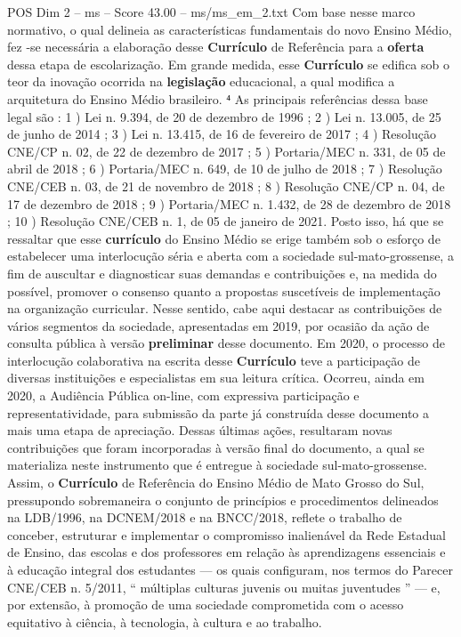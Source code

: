 \begin{textsample}{POS Dim 2 – ms – Score 43.00 – ms/ms\_em\_2.txt}
Com base nesse marco normativo, o qual delineia as características fundamentais do novo Ensino Médio, fez -se necessária a elaboração desse \textbf{Currículo} de Referência para a \textbf{oferta} dessa etapa de escolarização.
Em grande medida, esse \textbf{Currículo} se edifica sob o teor da inovação ocorrida na \textbf{legislação} educacional, a qual modifica a arquitetura do Ensino Médio brasileiro. ⁴ As principais referências dessa base legal são : 1 ) Lei n. 9.394, de 20 de dezembro de 1996 ; 2 ) Lei n. 13.005, de 25 de junho de 2014 ; 3 ) Lei n. 13.415, de 16 de fevereiro de 2017 ; 4 ) Resolução CNE/CP n. 02, de 22 de dezembro de 2017 ; 5 ) Portaria/MEC n. 331, de 05 de abril de 2018 ; 6 ) Portaria/MEC n. 649, de 10 de julho de 2018 ; 7 ) Resolução CNE/CEB n. 03, de 21 de novembro de 2018 ; 8 ) Resolução CNE/CP n. 04, de 17 de dezembro de 2018 ; 9 ) Portaria/MEC n. 1.432, de 28 de dezembro de 2018 ; 10 ) Resolução CNE/CEB n. 1, de 05 de janeiro de 2021.
Posto isso, há que se ressaltar que esse \textbf{currículo} do Ensino Médio se erige também sob o esforço de estabelecer uma interlocução séria e aberta com a sociedade sul-mato-grossense, a fim de auscultar e diagnosticar suas demandas e contribuições e, na medida do possível, promover o consenso quanto a propostas suscetíveis de implementação na organização curricular.
Nesse sentido, cabe aqui destacar as contribuições de vários segmentos da sociedade, apresentadas em 2019, por ocasião da ação de consulta pública à versão \textbf{preliminar} desse documento.
Em 2020, o processo de interlocução colaborativa na escrita desse \textbf{Currículo} teve a participação de diversas instituições e especialistas em sua leitura crítica.
Ocorreu, ainda em 2020, a Audiência Pública on-line, com expressiva participação e representatividade, para submissão da parte já construída desse documento a mais uma etapa de apreciação.
Dessas últimas ações, resultaram novas contribuições que foram incorporadas à versão final do documento, a qual se materializa neste instrumento que é entregue à sociedade sul-mato-grossense.
Assim, o \textbf{Currículo} de Referência do Ensino Médio de Mato Grosso do Sul, pressupondo sobremaneira o conjunto de princípios e procedimentos delineados na LDB/1996, na DCNEM/2018 e na BNCC/2018, reflete o trabalho de conceber, estruturar e implementar o compromisso inalienável da Rede Estadual de Ensino, das escolas e dos professores em relação às aprendizagens essenciais e à educação integral dos estudantes — os quais configuram, nos termos do Parecer CNE/CEB n. 5/2011, “ múltiplas culturas juvenis ou muitas juventudes ” — e, por extensão, à promoção de uma sociedade comprometida com o acesso equitativo à ciência, à tecnologia, à cultura e ao trabalho.

\end{textsample}
